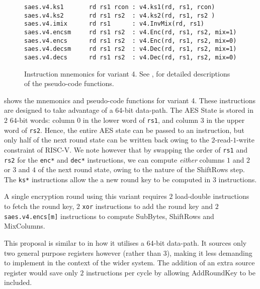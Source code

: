 
\begin{figure}
\begin{lstlisting}[language=pseudo,style=block]
saes.v4.ks1       rd rs1 rcon : v4.ks1(rd, rs1, rcon)
saes.v4.ks2       rd rs1 rs2  : v4.ks2(rd, rs1, rs2 )
saes.v4.imix      rd rs1      : v4.InvMix(rd, rs1)
saes.v4.encsm     rd rs1 rs2  : v4.Enc(rd, rs1, rs2, mix=1)
saes.v4.encs      rd rs1 rs2  : v4.Enc(rd, rs1, rs2, mix=0)
saes.v4.decsm     rd rs1 rs2  : v4.Dec(rd, rs1, rs2, mix=1)
saes.v4.decs      rd rs1 rs2  : v4.Dec(rd, rs1, rs2, mix=0)
\end{lstlisting}
\caption{
    Instruction mnemonics for variant 4.
    See ,  for detailed
    descriptions of the pseudo-code functions.
}
\label{fig:mnemonics:v4}
\end{figure}

 shows the mnemonics and pseudo-code functions
for variant 4.
These instructions are designed to take advantage of a 64-bit
data-path.
The AES State is stored in $2$ $64$-bit words: column $0$ in the
lower word of {\tt rs1}, and column $3$ in the upper word of {\tt rs2}.
Hence, the entire AES state can be passed to an instruction, but only
half of the next round state can be written back owing to the
$2$-read-$1$-write constraint of RISC-V.
We note however that by swapping the order of {\tt rs1} and {\tt rs2}
for the {\tt enc*} and {\tt dec*} instructions, we can compute {\em either}
columns $1$ and $2$ or $3$ and $4$ of the next round state, owing to
the nature of the ShiftRows step.
The {\tt ks*} instructions allow the a new round key to be computed
in $3$ instructions.

A single encryption round using this variant requires
$2$ load-double instructions to fetch the round key,
$2$ {\tt xor} instructions to add the round key
and
$2$ {\tt saes.v4.encs[m]} instructions to compute SubBytes, ShiftRows
and MixColumns.

This proposal is similar to \cite{SPARC:16} in how it utilises
a 64-bit data-path.
It sources only two general purpose registers however (rather than $3$),
making it less demanding to implement in the context of the wider
system.
The addition of an extra source register would save only $2$ instructions
per cycle by allowing AddRoundKey to be included.

